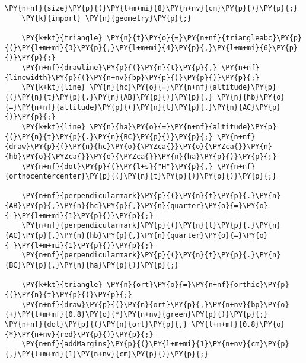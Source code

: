 \begin{Verbatim}[commandchars=\\\{\}]
    \PY{n+nf}{size}\PY{p}{(}\PY{l+m+mi}{8}\PY{n+nv}{cm}\PY{p}{)}\PY{p}{;}
    \PY{k}{import} \PY{n}{geometry}\PY{p}{;}

    \PY{k+kt}{triangle} \PY{n}{t}\PY{o}{=}\PY{n+nf}{triangleabc}\PY{p}{(}\PY{l+m+mi}{3}\PY{p}{,}\PY{l+m+mi}{4}\PY{p}{,}\PY{l+m+mi}{6}\PY{p}{)}\PY{p}{;}
    \PY{n+nf}{drawline}\PY{p}{(}\PY{n}{t}\PY{p}{,} \PY{n+nf}{linewidth}\PY{p}{(}\PY{n+nv}{bp}\PY{p}{)}\PY{p}{)}\PY{p}{;}
    \PY{k+kt}{line} \PY{n}{hc}\PY{o}{=}\PY{n+nf}{altitude}\PY{p}{(}\PY{n}{t}\PY{p}{.}\PY{n}{AB}\PY{p}{)}\PY{p}{,} \PY{n}{hb}\PY{o}{=}\PY{n+nf}{altitude}\PY{p}{(}\PY{n}{t}\PY{p}{.}\PY{n}{AC}\PY{p}{)}\PY{p}{;}
    \PY{k+kt}{line} \PY{n}{ha}\PY{o}{=}\PY{n+nf}{altitude}\PY{p}{(}\PY{n}{t}\PY{p}{.}\PY{n}{BC}\PY{p}{)}\PY{p}{;} \PY{n+nf}{draw}\PY{p}{(}\PY{n}{hc}\PY{o}{\PYZca{}}\PY{o}{\PYZca{}}\PY{n}{hb}\PY{o}{\PYZca{}}\PY{o}{\PYZca{}}\PY{n}{ha}\PY{p}{)}\PY{p}{;}
    \PY{n+nf}{dot}\PY{p}{(}\PY{l+s}{"H"}\PY{p}{,} \PY{n+nf}{orthocentercenter}\PY{p}{(}\PY{n}{t}\PY{p}{)}\PY{p}{)}\PY{p}{;}

    \PY{n+nf}{perpendicularmark}\PY{p}{(}\PY{n}{t}\PY{p}{.}\PY{n}{AB}\PY{p}{,}\PY{n}{hc}\PY{p}{,}\PY{n}{quarter}\PY{o}{=}\PY{o}{-}\PY{l+m+mi}{1}\PY{p}{)}\PY{p}{;}
    \PY{n+nf}{perpendicularmark}\PY{p}{(}\PY{n}{t}\PY{p}{.}\PY{n}{AC}\PY{p}{,}\PY{n}{hb}\PY{p}{,}\PY{n}{quarter}\PY{o}{=}\PY{o}{-}\PY{l+m+mi}{1}\PY{p}{)}\PY{p}{;}
    \PY{n+nf}{perpendicularmark}\PY{p}{(}\PY{n}{t}\PY{p}{.}\PY{n}{BC}\PY{p}{,}\PY{n}{ha}\PY{p}{)}\PY{p}{;}

    \PY{k+kt}{triangle} \PY{n}{ort}\PY{o}{=}\PY{n+nf}{orthic}\PY{p}{(}\PY{n}{t}\PY{p}{)}\PY{p}{;}
    \PY{n+nf}{draw}\PY{p}{(}\PY{n}{ort}\PY{p}{,}\PY{n+nv}{bp}\PY{o}{+}\PY{l+m+mf}{0.8}\PY{o}{*}\PY{n+nv}{green}\PY{p}{)}\PY{p}{;} \PY{n+nf}{dot}\PY{p}{(}\PY{n}{ort}\PY{p}{,} \PY{l+m+mf}{0.8}\PY{o}{*}\PY{n+nv}{red}\PY{p}{)}\PY{p}{;}
    \PY{n+nf}{addMargins}\PY{p}{(}\PY{l+m+mi}{1}\PY{n+nv}{cm}\PY{p}{,}\PY{l+m+mi}{1}\PY{n+nv}{cm}\PY{p}{)}\PY{p}{;}
\end{Verbatim}
